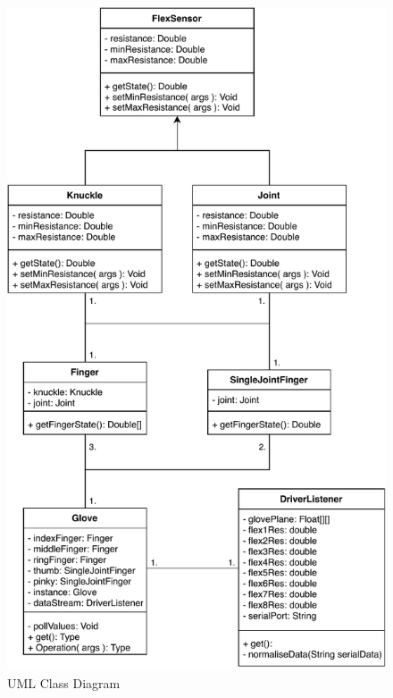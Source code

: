 \documentclass[12pt,a4paper,oneside]{book}
\theoremstyle{plain}
\numberwithin{equation}{chapter}
\begin{document}
\begin{figure}
    \centering
    \includegraphics[]{res/UMLClassDiagram.pdf}
    \caption{UML Class Diagram}
    \label{fig:UMLClassDiagram}
\end{figure}
\end{document}
